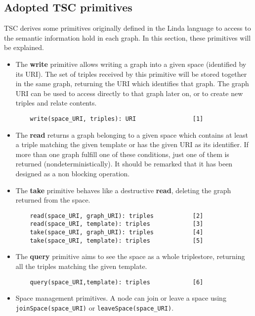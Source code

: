 

\subsection{Adopted TSC primitives}
\label{sec:primitives}

TSC derives some primitives originally defined in the Linda language \cite{gelernter_generative_1985} to access to the semantic information hold in each graph.
In this section, these primitives will be explained.

\begin{itemize}
 \item The \textbf{write} primitive allows writing a graph into a given space (identified by its URI). The set of
triples received by this primitive will be stored together in the same graph, returning the URI which identifies that
graph. The graph URI can be used to access directly to that graph later on, or to create new triples and relate
contents.

  \begin{lstlisting}
    write(space_URI, triples): URI                [1]
  \end{lstlisting}


  \item The \textbf{read} returns a graph belonging to a given space which contains at least a triple matching the given
template or has the given URI as its identifier. If more than one graph fulfill one of these conditions, just one of
them is returned (nondeterministically). It should be remarked that it has been designed as a non blocking operation.
  \item The \textbf{take} primitive behaves like a destructive \textbf{read}, deleting the graph returned from the
space.

  \begin{lstlisting}
    read(space_URI, graph_URI): triples           [2]
    read(space_URI, template): triples            [3]
    take(space_URI, graph_URI): triples           [4]
    take(space_URI, template): triples            [5]
  \end{lstlisting}


  \item The \textbf{query} primitive aims to see the space as a whole triplestore, returning all the triples matching
the given template.
  \begin{lstlisting}
    query(space_URI,template): triples            [6]
  \end{lstlisting}

  \item Space management primitives. A node can join or leave a space using \linebreak \texttt{joinSpace(space\_URI)} or
\texttt{leaveSpace(space\_URI)}.
\end{itemize}



